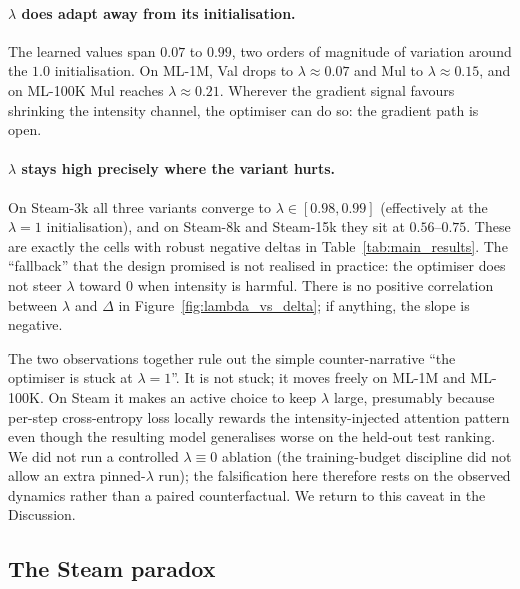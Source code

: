 \paragraph{$\lambda$ does adapt away from its initialisation.}
The learned values span $0.07$ to $0.99$, two orders of magnitude
of variation around the $1.0$ initialisation. On ML-1M, Val drops to
$\lambda \approx 0.07$ and Mul to $\lambda \approx 0.15$, and on
ML-100K Mul reaches $\lambda \approx 0.21$. Wherever the gradient signal favours shrinking the intensity channel,
the optimiser can do so: the gradient path is open.

\paragraph{$\lambda$ stays high precisely where the variant hurts.}
On Steam-3k all three variants converge to $\lambda \in [0.98, 0.99]$
(effectively at the $\lambda{=}1$ initialisation), and on Steam-8k
and Steam-15k they sit at $0.56$--$0.75$. These are exactly the cells
with robust negative deltas in Table~\ref{tab:main_results}. The
``fallback'' that the design promised is not realised in practice:
the optimiser does not steer $\lambda$ toward $0$ when intensity is
harmful. There is no positive correlation between $\lambda$ and $\Delta$
in Figure~\ref{fig:lambda_vs_delta}; if anything, the slope is
negative.

The two observations together rule out the simple counter-narrative
``the optimiser is stuck at $\lambda{=}1$''. It is not stuck; it
moves freely on ML-1M and ML-100K. On Steam it makes an active choice
to keep $\lambda$ large, presumably because per-step cross-entropy
loss locally rewards the intensity-injected attention pattern even
though the resulting model generalises worse on the held-out test
ranking. We did not run a controlled $\lambda{\equiv}0$ ablation
(the training-budget discipline did not allow an extra pinned-$\lambda$ run); the
falsification here therefore rests on the observed dynamics rather
than a paired counterfactual. We return to this caveat in the
Discussion.

\subsection{The Steam paradox}
\label{sec:analysis:steam}

